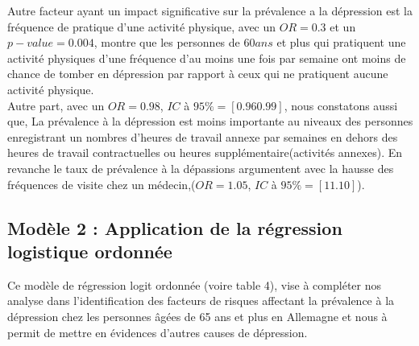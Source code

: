 \documentclass[a4paper]{article}
\begin{document}
Autre facteur ayant un impact significative sur la prévalence a la dépression est la fréquence de pratique d’une activité physique, avec un  $OR = 0.3$ et un $p-value = 0.004$, montre que les personnes de $60 ans$ et plus qui pratiquent une activité physiques d’une fréquence d’au moins une fois par semaine ont moins de chance de tomber en dépression par rapport à ceux qui ne pratiquent aucune activité  physique.\\

Autre part, avec un $OR = 0.98$, $IC$ à $95 \% = [0.96   0.99]$, nous constatons aussi que,  La prévalence à la dépression est moins importante au niveaux des personnes enregistrant un nombres d’heures de travail annexe par semaines en dehors des heures de travail contractuelles ou heures supplémentaire(activités annexes). En revanche le taux de prévalence à la dépassions argumentent avec la hausse des fréquences de visite chez un médecin,($OR = 1.05$, $IC$ à $95\% = [1  1.10]$).


\newpage

\subsection{Modèle 2 :  Application de la régression logistique ordonnée}

Ce modèle de régression logit ordonnée (voire table 4), vise à compléter nos analyse dans l’identification des facteurs de risques affectant la prévalence à la dépression chez les personnes âgées de 65 ans et plus en Allemagne et nous à permit de mettre en évidences d’autres causes de dépression.
\end{document}
